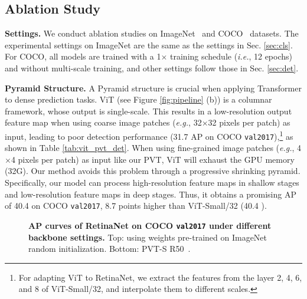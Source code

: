 \documentclass[10pt,twocolumn,letterpaper]{article}
\def\ie{\emph{i.e.}}
\def\eg{\emph{e.g.}}
\begin{document}
\subsection{Ablation Study}


\noindent\textbf{Settings.}
%
We conduct ablation studies on ImageNet~\cite{deng2009imagenet} and COCO~\cite{lin2014microsoft} datasets.
The experimental settings on ImageNet are the same as the settings in Sec. \ref{sec:cls}.
For COCO, all models are trained with a 1$\times$ training schedule (\ie, 12 epochs) and without multi-scale training, and other settings follow those in Sec. \ref{sec:det}.

\begin{table}[t]
    \centering
    \renewcommand\arraystretch{ 1.0}
    \setlength{\tabcolsep}{1.1mm}
    \footnotesize
    
     
    \caption{\textbf{Performance comparison between ViT and our PVT using  RetinaNet for object detection.} ViT-Small/4 runs out of GPU memory due to small patch size (\ie, $4\!\times\!4$ per patch). ViT-Small/32 obtains 31.7 AP on COCO \texttt{val2017},  which is 8.7 points lower than our PVT-Small.}
    \label{tab:vit_pvt_det}
\end{table}



\noindent\textbf{Pyramid Structure.} A Pyramid structure is crucial when applying Transformer to dense prediction tasks. ViT (see Figure \ref{fig:pipeline} (b)) is a columnar framework, whose output is single-scale. This results in a low-resolution output feature map when using coarse image patches (\eg, 32$\times$32 pixels per patch) as input,
%
leading to poor detection performance (31.7 AP on COCO \texttt{val2017}),\footnote{For adapting ViT to RetinaNet, we extract the features from the layer 2, 4, 6, and 8 of ViT-Small/32, and interpolate them to different scales.} as shown in Table \ref{tab:vit_pvt_det}. When using fine-grained image patches (\eg, 4$\times$4 pixels per patch) as input like our PVT, ViT will exhaust the GPU memory (32G).
%
Our method avoids this problem through a progressive shrinking pyramid. Specifically, our model can process high-resolution feature maps in shallow stages and low-resolution feature maps in deep stages.
Thus, it obtains a promising AP of 40.4 on COCO \texttt{val2017}, 8.7 points higher than ViT-Small/32 (40.4 ).

\begin{figure}
		\centering
		\setlength{\fboxrule}{0pt}
		\caption{\textbf{AP curves of RetinaNet on COCO \texttt{val2017} under different backbone settings.} Top: using weights pre-trained on ImageNet \vs random initialization. Bottom: PVT-S \vs R50~\cite{he2016deep}.}
		\label{fig:pretrain}
\end{figure}
\end{document}
